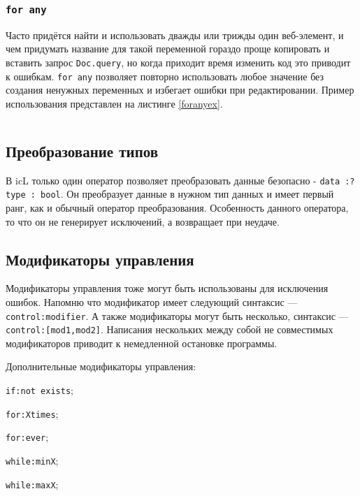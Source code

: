 \begin{sourcecode}
	\label{ifexistsex}
    \inputminted[linenos]{icl}{../sources/ifexistsex.icL}
\end{sourcecode}

\subsubsection{\texttt{for any}}

Часто придётся найти и использовать дважды или трижды один веб-элемент, и чем придумать название для такой переменной гораздо проще копировать и вставить запрос \texttt{Doc.query}, но когда приходит время изменить код это приводит к ошибкам. \texttt{for any} позволяет повторно использовать любое значение без создания ненужных переменных и избегает ошибки при редактировании. Пример использования представлен на листинге \ref{foranyex}.

\begin{sourcecode}
	\label{foranyex}
    \inputminted[linenos]{icl}{../sources/foranyex.icL}
\end{sourcecode}

\subsection{Преобразование типов}

В icL только один оператор позволяет преобразовать данные безопасно - \texttt{data :? type : bool}.
Он преобразует данные в нужном тип данных и имеет первый ранг, как и обычный оператор преобразования. Особенность данного оператора, то что он не генерирует исключений, а возвращает \void{} при неудаче.

\subsection{Модификаторы управления}

Модификаторы управления тоже могут быть использованы для исключения ошибок. Напомню что модификатор имеет следующий синтаксис — \texttt{control:modifier}. А также модификаторы могут быть несколько, синтаксис — \texttt{control:[mod1,mod2]}. Написания нескольких между собой не совместимых модификаторов приводит к немедленной остановке программы.

Дополнительные модификаторы управления: 
\begin{icItems}
	\item \texttt{if:not exists};
	\item \texttt{for:Xtimes};
	\item \texttt{for:ever};
	\item \texttt{while:minX};
	\item \texttt{while:maxX};
\end{icItems}

